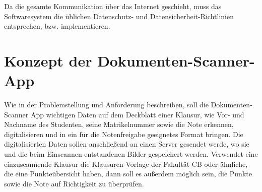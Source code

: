 \documentclass[nomenclature, oneside, 150]{HSMW-Thesis}
\begin{document}
	Da die gesamte Kommunikation über das Internet geschieht, muss das Softwaresystem die üblichen Datenschutz- und Datensicherheit-Richtlinien entsprechen, bzw. implementieren.
	


\chapter{Konzept der Dokumenten-Scanner-App}\hypertarget{konzept}{}
	Wie in der Problemstellung und Anforderung beschreiben, soll die Dokumenten-Scanner App wichtigen Daten auf dem Deckblatt einer Klausur, wie Vor- und Nachname des Studenten, seine Matrikelnummer sowie die Note erkennen, digitalisieren und in ein für die Notenfreigabe geeignetes Format bringen. Die digitalisierten Daten sollen anschließend an einen Server gesendet werde, wo sie und die beim Einscannen entstandenen Bilder gespeichert werden. Verwendet eine einzuscannende Klausur die Klausuren-Vorlage der Fakultät CB oder ähnliche, die eine Punkteübersicht haben, dann soll es außerdem möglich sein, die Punkte sowie die Note auf Richtigkeit zu überprüfen. 
\end{document}

